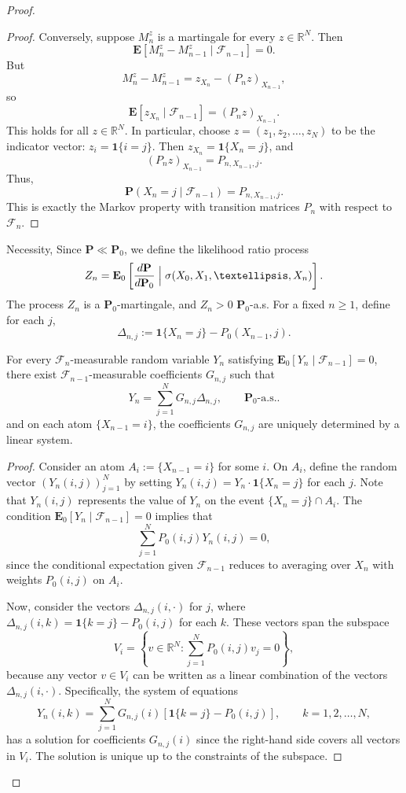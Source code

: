 \documentclass[10pt,a4paper]{amsart}
\begin{document}
\begin{proof}
\begin{proof}
    Conversely, suppose $M_n^z$ is a martingale for every $z \in \mathbb R^N$. Then
    $$\mathbf E[M_{n}^z - M_{n-1}^z \mid \mathscr F_{n-1}] = 0.$$
    But
    $$M_{n}^z - M_{n-1}^z = z_{X_{n}} - (P_{n} z)_{X_{n-1}},$$
    so
    $$\mathbf E[z_{X_{n}} \mid \mathscr F_{n-1}] = (P_{n} z)_{X_{n-1}}.$$
    This holds for all $z \in \mathbb R^N$. In particular, choose $z = (z_1,z_2,\dots,z_N)$ to be the indicator vector: $z_i = \mathbf 1{\{i=j\}}$. Then $z_{X_{n}} = \mathbf 1{\{X_{n} = j\}}$, and
    $$(P_{n} z)_{X_{n-1}} = P_{n, X_{n-1}, j}.$$
    Thus,
    $$\mathbf P(X_{n} = j \mid \mathscr F_{n-1}) = P_{n, X_{n-1}, j}.$$
    This is exactly the Markov property with transition matrices $P_n$ with respect to $\mathscr F_n$. \end{proof}


    Necessity, Since $\mathbf{P} \ll \mathbf{P}_0$, we define the likelihood ratio process
    $$Z_n = \mathbf E_0 \left[ \frac{d\mathbf{P}}{d\mathbf{P}_0} \Bigm| {\sigma(X_0, X_1, \dots, X_n)}\right].$$
    The process $Z_n$ is a $\mathbf{P}_0$-martingale, and $Z_n > 0$ $\mathbf{P}_0$-a.s. For a fixed \( n \ge 1 \), define for each \( j \),
    \[    \Delta_{n,j} := \mathbf{1}{\{X_n = j\}} - P_0(X_{n-1}, j).\]

    \begin{lemma}\label{lem: delta-basis} For every \( \mathscr{F}_n \)-measurable random variable \( Y_n \) satisfying \( \mathbf{E}_0[Y_n \mid \mathscr{F}_{n-1}] = 0 \), there exist \( \mathscr{F}_{n-1} \)-measurable coefficients \( G_{n,j} \) such that
    \[Y_n = \sum_{j=1}^N G_{n,j}\Delta_{n,j}, \qquad \mathbf{P}_0\text{-a.s.}.\]
    and on each atom \( \{X_{n-1} = i\} \), the coefficients \( G_{n,j} \) are uniquely determined by a linear system.
    \end{lemma}

\begin{proof}
Consider an atom \( A_i := \{X_{n-1} = i\} \) for some \( i\). On \( A_i \), define the random vector \( (Y_n(i,j))_{j=1}^N \) by setting \( Y_n(i,j) = Y_n \cdot \mathbf{1}{\{X_n = j\}} \) for each \( j \). Note that \( Y_n(i,j) \) represents the value of \( Y_n \) on the event \( \{X_n = j\} \cap A_i \). The condition \( \mathbf{E}_0[Y_n \mid \mathscr{F}_{n-1}] = 0 \) implies that
\[\sum_{j=1}^N  P_0(i,j) Y_n(i,j) = 0,\]
since the conditional expectation given \( \mathscr{F}_{n-1} \) reduces to averaging over \( X_n \) with weights \( P_0(i,j) \) on \( A_i \).

Now, consider the vectors \( \Delta_{n,j}(i, \cdot) \) for \(j\), where \( \Delta_{n,j}(i, k) = \mathbf{1}{\{k = j\}} - P_0(i,j) \) for each \(k\). These vectors span the subspace
\[V_i = \left\{ v \in \mathbb{R}^N : \sum_{j=1}^N  P_0(i,j) v_j = 0 \right\},\]
because any vector \( v \in V_i \) can be written as a linear combination of the vectors \( \Delta_{n,j}(i, \cdot) \). Specifically, the system of equations
\[Y_n(i, k) = \sum_{j=1}^N  G_{n,j}(i) \left[ \mathbf{1}{\{k = j\}} - P_0(i,j) \right], \qquad k = 1,2,\dots, N,\]
has a solution for coefficients \( G_{n,j}(i) \) since the right-hand side covers all vectors in \( V_i \). The solution is unique up to the constraints of the subspace.


\end{proof}
\end{proof}
\end{document}
